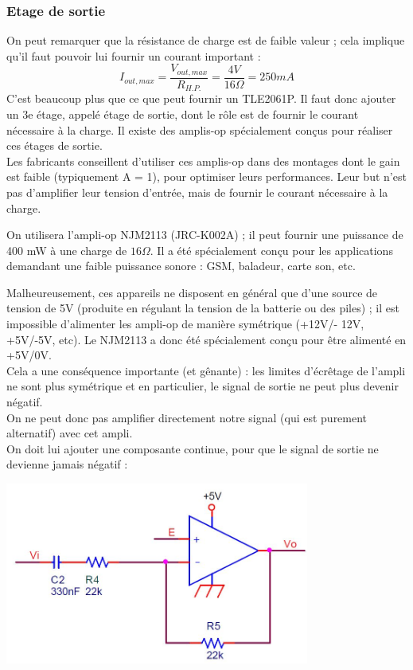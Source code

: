 \documentclass{../template/labo}
\begin{document}
\subsubsection{Etage de sortie}
On peut remarquer que la résistance de charge est de faible valeur ; cela implique qu'il faut pouvoir lui fournir un courant important :
$$I_{out,max}=\frac{V_{out,max}}{R_{H.P.}}=\frac{4V}{16\Omega}=250mA$$
C'est beaucoup plus que ce que peut fournir un TLE2061P. Il faut donc ajouter un 3e étage, appelé étage de sortie, dont le rôle est de fournir le courant nécessaire à la charge. Il existe des amplis-op spécialement conçus pour réaliser ces étages de sortie.\\
Les fabricants conseillent d'utiliser ces amplis-op dans des montages dont le gain est faible (typiquement A = 1), pour optimiser leurs performances. Leur but n'est pas d'amplifier leur tension d'entrée, mais de fournir le courant
nécessaire à la charge.

On utilisera l'ampli-op NJM2113 (JRC-K002A) ; il peut fournir une puissance de 400 mW à une charge de $16\Omega$. Il a été spécialement conçu pour les applications demandant une faible puissance sonore : GSM, baladeur, carte son, etc.

Malheureusement, ces appareils ne disposent en général que d'une source de tension de 5V (produite en régulant la tension de la batterie ou des piles) ; il est impossible d'alimenter les ampli-op de manière symétrique (+12V/- 12V, +5V/-5V, etc). Le NJM2113 a donc été spécialement conçu pour être alimenté en +5V/0V.\\
Cela a une conséquence importante (et gênante) : les limites d'écrêtage de l'ampli ne sont plus symétrique et en particulier, le signal de sortie ne peut plus devenir négatif.\\
On ne peut donc pas amplifier directement notre signal (qui est purement alternatif) avec cet ampli.\\
On doit lui ajouter une composante continue, pour que le signal de sortie ne devienne jamais négatif :
\begin{center}
\includegraphics[width=10cm]{figures/AOPetage3}
\end{center}
\end{document}
